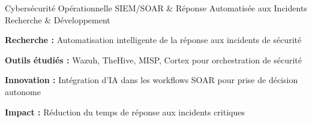 \begin{cventries}
    \cventry
    {Cybersécurité Opérationnelle}
    {SIEM/SOAR \& Réponse Automatisée aux Incidents} %
    {Recherche \& Développement} %
    {} %
    {
        \begin{cvitems} %
            \item {\textbf{Recherche :} Automatisation intelligente de la réponse aux incidents de sécurité}
            \item {\textbf{Outils étudiés :} Wazuh, TheHive, MISP, Cortex pour orchestration de sécurité}
            \item {\textbf{Innovation :} Intégration d'IA dans les workflows SOAR pour prise de décision autonome}
            \item {\textbf{Impact :} Réduction du temps de réponse aux incidents critiques}
        \end{cvitems}
    }

\end{cventries}
